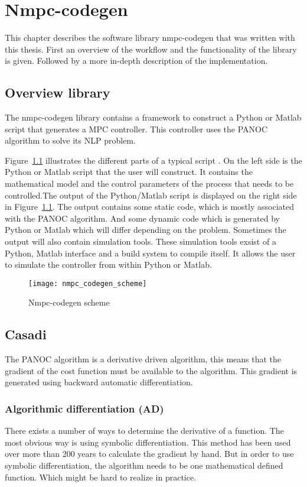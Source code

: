 \chapter{Nmpc-codegen}
This chapter describes the software library nmpc-codegen that was written with this thesis. First an overview of the workflow and the functionality of the library is given. Followed by a more in-depth description of the implementation.
\section{Overview library}
The nmpc-codegen library contains a framework to construct a Python or Matlab script that generates a MPC controller. This controller uses the PANOC algorithm to solve its NLP problem.

Figure~\ref{fig:nmpc-codegen scheme} illustrates the different parts of a typical script . On the left side is the Python or Matlab script that the user will construct. It contains the mathematical model and the control parameters of the process that needs to be controlled.The output of the Python/Matlab script is displayed on the right side in Figure~\ref{fig:nmpc-codegen scheme}. The output contains some static code, which is mostly associated with the PANOC algorithm. And some dynamic code which is generated by Python or Matlab which will differ depending on the problem. Sometimes the output will also contain simulation tools. These simulation tools exsist of a Python, Matlab interface and a build system to compile itself. It allows the user to simulate the controller from within Python or Matlab.
	\begin{figure}[H]
		\centering
		\texttt{[image: nmpc\_codegen\_scheme]}
		\caption{Nmpc-codegen scheme}
		\label{fig:nmpc-codegen scheme}
	\end{figure}

\section{Casadi}
The PANOC algorithm is a derivative driven algorithm, this means that the gradient of the cost function must be available to the algorithm. This gradient is generated using backward automatic differentiation.

\subsection{Algorithmic differentiation (AD)}
There exists a number of ways to determine the derivative of a function. The most obvious way is using symbolic differentiation. This method has been used over more than 200 years to calculate the gradient by hand. But in order to use symbolic differentiation, the algorithm needs to be one mathematical defined function. Which might be hard to realize in practice.

